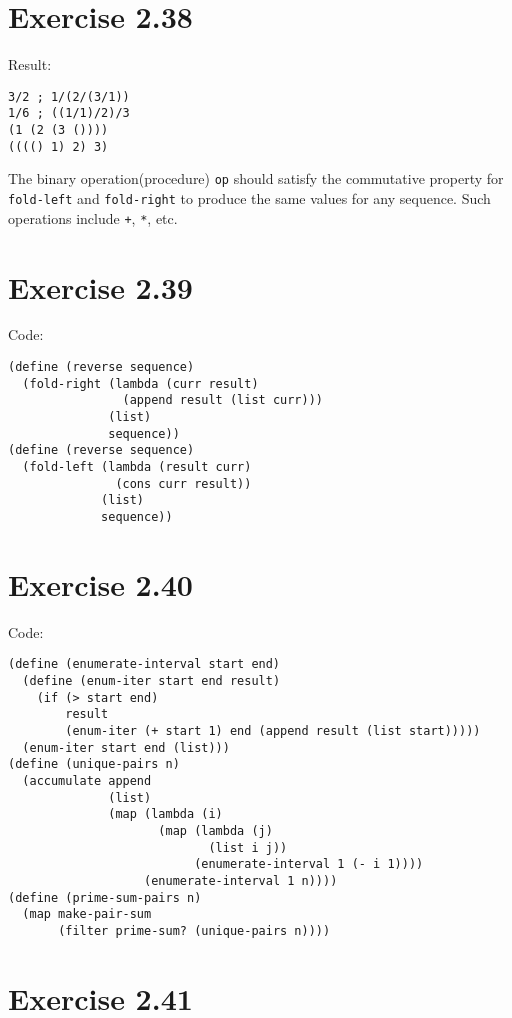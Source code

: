 \documentclass[../main.tex]{subfiles}
\begin{document}
\section{Exercise 2.38}

Result:

\begin{lstlisting}
3/2 ; 1/(2/(3/1))
1/6 ; ((1/1)/2)/3
(1 (2 (3 ())))
(((() 1) 2) 3)
\end{lstlisting}

The binary operation(procedure) \lstinline{op}
 should satisfy the commutative property for
 \lstinline{fold-left} and \lstinline{fold-right}
 to produce the same values for any sequence. Such
 operations include \lstinline{+}, \lstinline{*},
 etc.

\section{Exercise 2.39}

Code:

\begin{lstlisting}
(define (reverse sequence)
  (fold-right (lambda (curr result)
                (append result (list curr)))
              (list)
              sequence))
(define (reverse sequence)
  (fold-left (lambda (result curr)
               (cons curr result))
             (list)
             sequence))
\end{lstlisting}

\section{Exercise 2.40}

Code:

\begin{lstlisting}
(define (enumerate-interval start end)
  (define (enum-iter start end result)
    (if (> start end)
        result
        (enum-iter (+ start 1) end (append result (list start)))))
  (enum-iter start end (list)))
(define (unique-pairs n)
  (accumulate append
              (list)
              (map (lambda (i)
                     (map (lambda (j)
                            (list i j))
                          (enumerate-interval 1 (- i 1))))
                   (enumerate-interval 1 n))))
(define (prime-sum-pairs n)
  (map make-pair-sum
       (filter prime-sum? (unique-pairs n))))
\end{lstlisting}

\section{Exercise 2.41}
\end{document}

